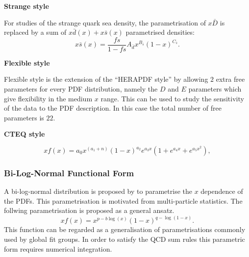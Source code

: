 \begin{description}
\item \bf{Strange style}\rm


For studies of the strange quark sea density, the parametrisation of $x\bar{D}$ is replaced by a sum of $x\bar{d}(x)+x\bar{s}(x)$ parametrised densities:
\begin{equation}
x\bar{s}(x)=\frac{fs}{1-fs} A_{\bar{d}}x^{B_{\bar{s}}}(1-x)^{C_{\bar{s}}} .
\end{equation}

\item \bf{Flexible style}\rm

Flexible style is the extension of the ``HERAPDF style'' by allowing $2$ extra free parameters for every PDF distribution, 
namely the $D$ and $E$ parameters which give flexibility in the medium $x$ range. 
This can be used to study the sensitivity of the data to the PDF description. In this case the total number of free parameters is $22$.


\item \bf{CTEQ style}\rm


\begin{equation}
 xf(x) = a_0 x^{(a_1+n)} (1-x)^{a_2} e^{a_3x} (1 + e^{a_4 x} + e^{a_5 x^2}),
\label{eqn:pdf_cteq}
\end{equation}
%
\end{description}

\subsubsection{Bi-Log-Normal Functional Form}
\label{sec:log}
A bi-log-normal distribution is proposed by \cite{AndreSchoening} to parametrise the $x$ dependence of the PDFs.
This parametrisation is motivated from multi-particle statistics. The follwing parametrisation is proposed as a general ansatz.
\begin{equation}
xf(x)=x^{p-b\log(x)}(1-x)^{q-\log(1-x)}.
\label{eq:AS}
\end{equation}
This function can be regarded as a generalisation of parametrisations commonly used by global fit groups.
In order to satisfy the QCD sum rules this parametric form requires numerical integration.

